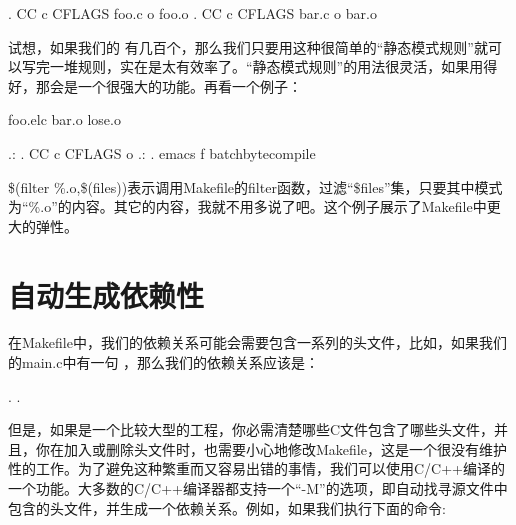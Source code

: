 \documentclass[a4paper,10pt]{sphinxmanual}
\begin{document}
\begin{sphinxVerbatim}[commandchars=\\\{\}]
 .
    CC \PYGZhy{}c CFLAGS foo.c \PYGZhy{}o foo.o
 .
    CC \PYGZhy{}c CFLAGS bar.c \PYGZhy{}o bar.o
\end{sphinxVerbatim}

试想，如果我们的  有几百个，那么我们只要用这种很简单的“静态模式规则”就可以写完一堆规则，实在是太有效率了。“静态模式规则”的用法很灵活，如果用得好，那会是一个很强大的功能。再看一个例子：

\begin{sphinxVerbatim}[commandchars=\\\{\}]
  foo.elc bar.o lose.o

 \PYGZpc{}.: \PYGZpc{}.
    CC \PYGZhy{}c CFLAGS \PYGZdl{}\PYGZlt{} \PYGZhy{}o 
 \PYGZpc{}.: \PYGZpc{}.
    emacs \PYGZhy{}f batch\PYGZhy{}byte\PYGZhy{}compile \PYGZdl{}\PYGZlt{}
\end{sphinxVerbatim}

\$(filter \%.o,\$(files))表示调用Makefile的filter函数，过滤“\$files”集，只要其中模式为“\%.o”的内容。其它的内容，我就不用多说了吧。这个例子展示了Makefile中更大的弹性。


\section{自动生成依赖性}
\label{\detokenize{rules:id9}}
在Makefile中，我们的依赖关系可能会需要包含一系列的头文件，比如，如果我们的main.c中有一句
 ，那么我们的依赖关系应该是：

\begin{sphinxVerbatim}[commandchars=\\\{\}]
 . .
\end{sphinxVerbatim}

但是，如果是一个比较大型的工程，你必需清楚哪些C文件包含了哪些头文件，并且，你在加入或删除头文件时，也需要小心地修改Makefile，这是一个很没有维护性的工作。为了避免这种繁重而又容易出错的事情，我们可以使用C/C++编译的一个功能。大多数的C/C++编译器都支持一个“-M”的选项，即自动找寻源文件中包含的头文件，并生成一个依赖关系。例如，如果我们执行下面的命令:
\end{document}
